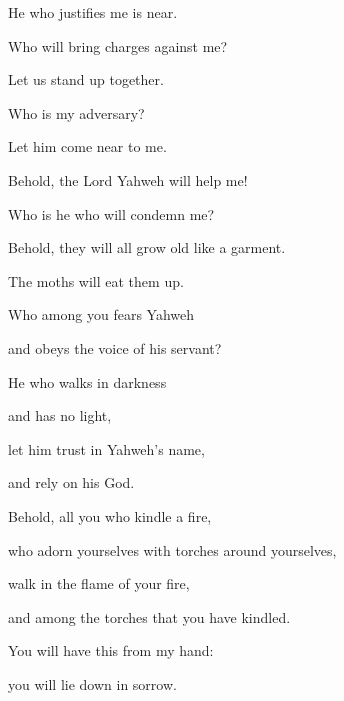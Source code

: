 {\par }{\Q {}He who justifies me is near.
\par }{\QB Who will bring charges against me?
\par }{\Q Let us stand up together.
\par }{\QB Who is my adversary?
\par }{\QB Let him come near to me.
\par }{\Q {}Behold, the Lord Yahweh will help me!
\par }{\QB Who is he who will condemn me?
\par }{\Q Behold, they will all grow old like a garment.
\par }{\QB The moths will eat them up.
\par }{\BB \par }{\Q {}Who among you fears Yahweh
\par }{\QB and obeys the voice of his servant?
\par }{\Q He who walks in darkness
\par }{\QB and has no light,
\par }{\Q let him trust in Yahweh’s name,
\par }{\QB and rely on his God.
\par }{\Q {}Behold, all you who kindle a fire,
\par }{\QB who adorn yourselves with torches around yourselves,
\par }{\Q walk in the flame of your fire,
\par }{\QB and among the torches that you have kindled.
\par }{\Q You will have this from my hand:
\par }{\QB you will lie down in sorrow.

}
